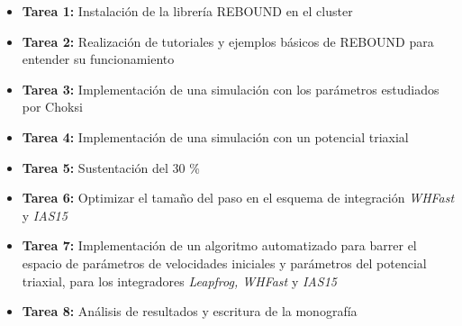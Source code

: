 	\begin{itemize}
		\item \textbf{Tarea 1:} Instalaci\'on de la librer\'ia REBOUND en el cluster
		\item \textbf{Tarea 2:} Realización de tutoriales y ejemplos básicos de REBOUND para entender su funcionamiento
		\item \textbf{Tarea 3:} Implementación de una simulación con los par\'ametros estudiados por Choksi \cite{choksi2017recoiling}
		\item \textbf{Tarea 4:} Implementaci\'on de una simulaci\'on con un potencial triaxial
		\item \textbf{Tarea 5:} Sustentaci\'on del 30 \%
		\item \textbf{Tarea 6:} Optimizar el tama\~no del paso en el esquema de integraci\'on \textit{WHFast} y \textit{IAS15}
		\item \textbf{Tarea 7:} Implementaci\'on de un algoritmo automatizado para barrer el espacio de par\'ametros de velocidades iniciales y par\'ametros del potencial triaxial, para los integradores \textit{Leapfrog, WHFast} y \textit{IAS15}
		\item \textbf{Tarea 8:} An\'alisis de resultados y escritura de la monograf\'ia
	\end{itemize}